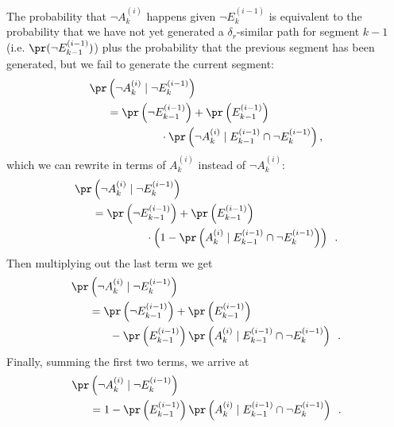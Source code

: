 The probability that $\neg A^{(i)}_k$ happens given $\neg E^{(i-1)}_k$ is equivalent to the probability that we have not yet generated a $\delta_r$-similar path for segment $k-1$ (i.e. $\pr( \neg E^{(i-1)}_{k-1} )$) plus the probability that the previous segment has been generated, but we fail to generate the current segment:
\begin{equation}
\begin{split}
    \pr&\left( \neg A^{(i)}_k \mid \neg E^{(i-1)}_k \right) \\
    &= \pr\left( \neg E^{(i-1)}_{k-1} \right) + \pr\left( E^{(i-1)}_{k-1} \right) \\
    &  \hspace{1.7cm} \cdot \pr\left( \neg A_k^{(i)} \mid E_{k-1}^{(i-1)} \cap \neg E_k^{(i-1)} \right), \\
\end{split}
\end{equation}
which we can rewrite in terms of $A_k^{(i)}$ instead of $\neg A_k^{(i)}$:
\begin{equation}
\begin{split}
    \pr&\left( \neg A^{(i)}_k \mid \neg E^{(i-1)}_k \right) \\
       &= \pr\left( \neg E^{(i-1)}_{k-1} \right) + \pr\left( E^{(i-1)}_{k-1} \right) \\
       &  \hspace{1.7cm} \cdot \left(1 - \pr\left( A_k^{(i)} \mid E_{k-1}^{(i-1)} \cap \neg E_k^{(i-1)} \right) \right) \enspace . \\
\end{split}
\end{equation}
Then multiplying out the last term we get
\begin{equation}
\begin{split}
    \pr&\left( \neg A^{(i)}_k \mid \neg E^{(i-1)}_k \right) \\
       &= \pr\left( \neg E^{(i-1)}_{k-1} \right) + \pr\left( E^{(i-1)}_{k-1} \right) \\
       &  \hspace{0.65cm} - \pr\left( E^{(i-1)}_{k-1} \right) \pr\left( A_k^{(i)} \mid E_{k-1}^{(i-1)} \cap \neg E_k^{(i-1)} \right) \enspace . \\
\end{split}
\end{equation}
Finally, summing the first two terms, we arrive at
\begin{equation}
\begin{split}
    \pr&\left( \neg A^{(i)}_k \mid \neg E^{(i-1)}_k \right) \\
       &= 1 - \pr\left( E^{(i-1)}_{k-1} \right) \pr\left( A_k^{(i)} \mid E_{k-1}^{(i-1)} \cap \neg E_k^{(i-1)} \right) \enspace .
\end{split}
\end{equation}
